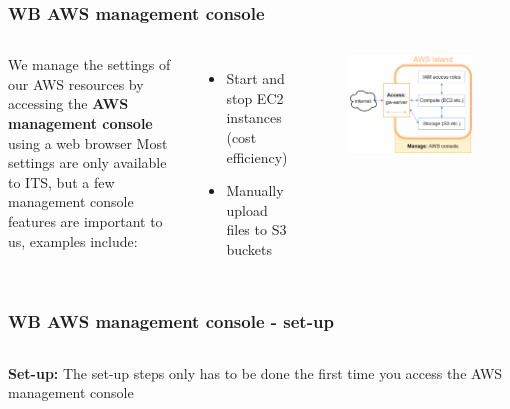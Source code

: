\documentclass[aspectratio=169]{beamer} %
\begin{document}
\begin{frame}
	\frametitle{WB AWS management console}
	\begin{columns}[c]
		We manage the settings of our AWS resources by accessing the \textbf{AWS management console} using a web browser
		\vspace{.5cm}\newline
		Most settings are only available to ITS, but a few management console features are important to us, examples include:
		\begin{itemize}
			\item Start and stop EC2 instances (cost efficiency)
			\item Manually upload files to S3 buckets
		\end{itemize}

		\begin{figure}
			\centering
			\includegraphics[width=\textwidth]{./img/wb-aws.png}
		\end{figure}

	\end{columns}
\end{frame}

\begin{frame}
	\frametitle{WB AWS management console - set-up}
	\begin{columns}[c]
		
		
		\textbf{Set-up:} The set-up steps only has to be done the first time you access the AWS management console

	\end{columns}
\end{frame}
\end{document}

